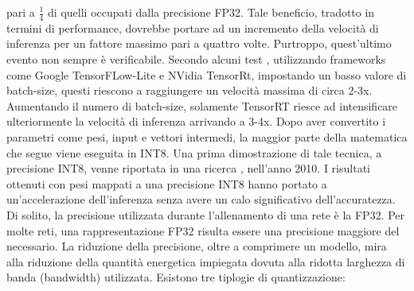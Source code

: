 pari a $\frac{1}{4}$ di quelli occupati dalla precisione FP32. Tale beneficio, tradotto in 
termini di performance, dovrebbe portare ad un incremento della velocità di 
inferenza per un fattore massimo pari a quattro volte. Purtroppo, quest'ultimo 
evento non sempre è verificabile. Secondo alcuni test \cite{LIANG2021370}, utilizzando 
frameworks come Google TensorFLow-Lite e NVidia TensorRt, impostando 
un basso valore di batch-size, questi riescono a raggiungere un velocità massima 
di circa 2-3x. Aumentando il numero di batch-size, solamente TensorRT 
riesce ad intensificare ulteriormente la velocità di inferenza arrivando a 
3-4x. Dopo aver convertito i parametri come pesi, input e vettori intermedi, 
la maggior parte della matematica che segue viene eseguita in INT8. Una 
prima dimostrazione di tale tecnica, a precisione INT8, venne riportata 
in una ricerca \cite{37631}, nell'anno 2010. I risultati ottenuti con pesi mappati 
a una precisione INT8 hanno portato a un'accelerazione dell'inferenza
senza avere un calo significativo dell'accuratezza. Di solito, la precisione 
utilizzata durante l'allenamento di una rete è la FP32. Per molte reti, una 
rappresentazione FP32 risulta essere una precisione maggiore del necessario.
La riduzione della precisione, oltre a comprimere un modello, mira alla riduzione della 
quantità energetica impiegata dovuta alla ridotta larghezza 
di banda (bandwidth) utilizzata. Esistono tre tiplogie di quantizzazione:
